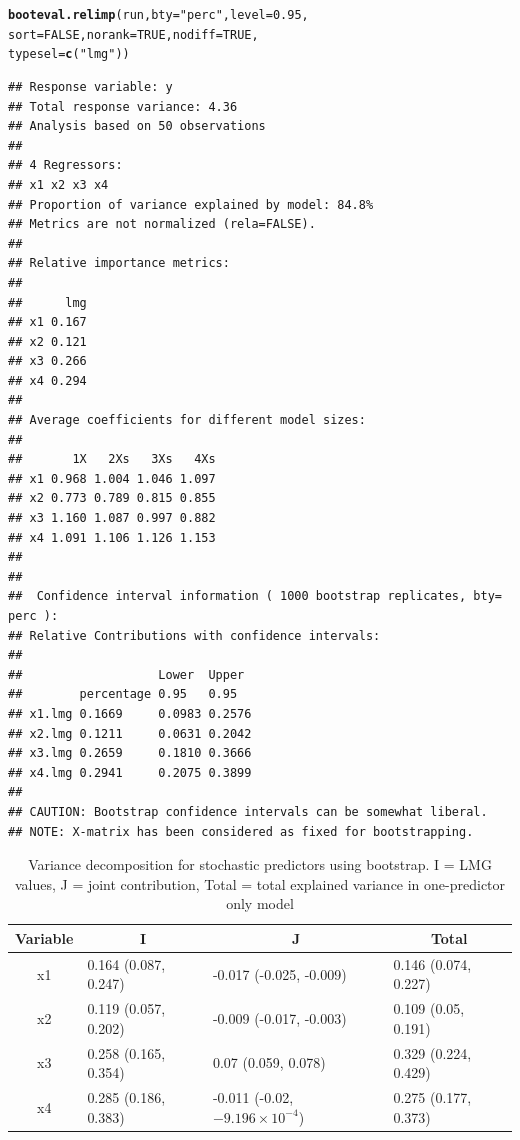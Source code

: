 \documentclass[11pt,a4paper,twoside]{book}\usepackage[]{graphicx}\usepackage[]{color}
\makeatletter
\newcommand{\hlnum}[1]{\textcolor[rgb]{0.686,0.059,0.569}{#1}}%
\newcommand{\hlstr}[1]{\textcolor[rgb]{0.192,0.494,0.8}{#1}}%
\newcommand{\hlstd}[1]{\textcolor[rgb]{0.345,0.345,0.345}{#1}}%
\newcommand{\hlkwc}[1]{\textcolor[rgb]{0.333,0.667,0.333}{#1}}%
\newcommand{\hlkwd}[1]{\textcolor[rgb]{0.737,0.353,0.396}{\textbf{#1}}}%
\newenvironment{kframe}{%
 \def\at@end@of@kframe{}%
 \ifinner\ifhmode%
  \def\at@end@of@kframe{\end{minipage}}%
  \begin{minipage}{\columnwidth}%
 \fi\fi%
 \def\FrameCommand##1{\hskip\@totalleftmargin \hskip-\fboxsep
 \colorbox{shadecolor}{##1}\hskip-\fboxsep
     \hskip-\linewidth \hskip-\@totalleftmargin \hskip\columnwidth}%
 \MakeFramed {\advance\hsize-\width
   \@totalleftmargin\z@ \linewidth\hsize
   \@setminipage}}%
 {\par\unskip\endMakeFramed%
 \at@end@of@kframe}
\newenvironment{knitrout}{}{} %
\makeatother
\begin{document}
\begin{knitrout}
\begin{kframe}
\begin{alltt}
\hlkwd{booteval.relimp}\hlstd{(run,} \hlkwc{bty} \hlstd{=} \hlstr{"perc"}\hlstd{,} \hlkwc{level} \hlstd{=} \hlnum{0.95}\hlstd{,}
                \hlkwc{sort} \hlstd{=} \hlnum{FALSE}\hlstd{,} \hlkwc{norank} \hlstd{=} \hlnum{TRUE}\hlstd{,} \hlkwc{nodiff} \hlstd{=} \hlnum{TRUE}\hlstd{,}
                \hlkwc{typesel} \hlstd{=} \hlkwd{c}\hlstd{(}\hlstr{"lmg"}\hlstd{))}
\end{alltt}
\begin{verbatim}
## Response variable: y 
## Total response variance: 4.36 
## Analysis based on 50 observations 
## 
## 4 Regressors: 
## x1 x2 x3 x4 
## Proportion of variance explained by model: 84.8%
## Metrics are not normalized (rela=FALSE). 
## 
## Relative importance metrics: 
## 
##      lmg
## x1 0.167
## x2 0.121
## x3 0.266
## x4 0.294
## 
## Average coefficients for different model sizes: 
## 
##       1X   2Xs   3Xs   4Xs
## x1 0.968 1.004 1.046 1.097
## x2 0.773 0.789 0.815 0.855
## x3 1.160 1.087 0.997 0.882
## x4 1.091 1.106 1.126 1.153
## 
##  
##  Confidence interval information ( 1000 bootstrap replicates, bty= perc ): 
## Relative Contributions with confidence intervals: 
##  
##                   Lower  Upper
##        percentage 0.95   0.95  
## x1.lmg 0.1669     0.0983 0.2576
## x2.lmg 0.1211     0.0631 0.2042
## x3.lmg 0.2659     0.1810 0.3666
## x4.lmg 0.2941     0.2075 0.3899
## 
## CAUTION: Bootstrap confidence intervals can be somewhat liberal. 
## NOTE: X-matrix has been considered as fixed for bootstrapping.
\end{verbatim}
\end{kframe}
\end{knitrout}

\begin{table}[h]
\centering
\begin{tabular}{clll}
  \hline
  \multicolumn{1}{c}{\textbf{Variable}} & \multicolumn{1}{c}{\textbf{I}} &\multicolumn{1}{c}{\textbf{J}} & \multicolumn{1}{c}{\textbf{Total}} \\
  \hline
x1 & 0.164 (0.087, 0.247)  & -0.017 (-0.025, -0.009)   & 0.146 (0.074, 0.227)  \\ 
x2 & 0.119 (0.057, 0.202)  & -0.009 (-0.017, -0.003)   & 0.109 (0.05, 0.191)  \\ 
x3 & 0.258 (0.165, 0.354)  & 0.07 (0.059, 0.078)   & 0.329 (0.224, 0.429)  \\ 
x4 & 0.285 (0.186, 0.383)  & -0.011 (-0.02, \ensuremath{-9.196\times 10^{-4}})   & 0.275 (0.177, 0.373)  \\ 

   \hline
\end{tabular}
\caption{Variance decomposition for stochastic predictors using bootstrap. I = LMG values, J = joint contribution, Total = total explained variance in one-predictor only model}
\label{tbl:fundus.to.SLO}
\end{table}
\end{document}
